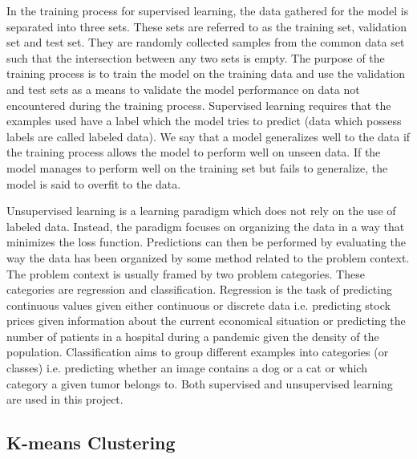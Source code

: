 In the training process for supervised learning, the data gathered for the model is separated into three sets. These sets are referred to as the training set, validation set and test set. They are randomly collected samples from the common data set such that the intersection between any two sets is empty. The purpose of the training process is to train the model on the training data and use the validation and test sets as a means to validate the model performance on data not encountered during the training process. Supervised learning requires that the examples used have a label which the model tries to predict (data which possess labels are called labeled data). We say that a model generalizes well to the data if the training process allows the model to perform well on unseen data. If the model manages to perform well on the training set but fails to generalize, the model is said to overfit to the data. 

Unsupervised learning is a learning paradigm which does not rely on the use of labeled data. Instead, the paradigm focuses on organizing the data in a way that minimizes the loss function. Predictions can then be performed by evaluating the way the data has been organized by some method related to the problem context. The problem context is usually framed by two problem categories. These categories are regression and classification. Regression is the task of predicting continuous values given either continuous or discrete data i.e. predicting stock prices given information about the current economical situation or predicting the number of patients in a hospital during a pandemic given the density of the population. Classification aims to group different examples into categories (or classes) i.e. predicting whether an image contains a dog or a cat or which category a given tumor belongs to. Both supervised and unsupervised learning are used in this project.


\subsection{K-means Clustering}

